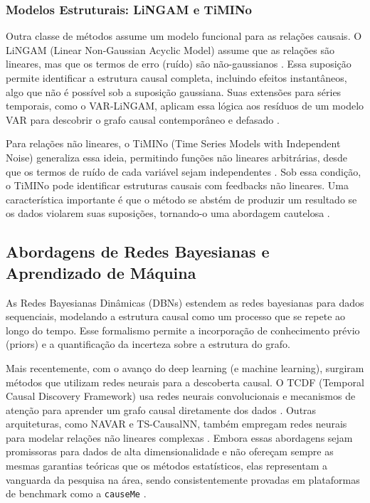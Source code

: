 \documentclass[12pt, a4paper]{article}
\begin{document}
\subsubsection{Modelos Estruturais: LiNGAM e TiMINo}
Outra classe de métodos assume um modelo funcional para as relações causais.
O LiNGAM (Linear Non-Gaussian Acyclic Model) assume que as relações são lineares, mas que os termos de erro (ruído) são não-gaussianos \cite{shimizu2006}. Essa suposição permite identificar a estrutura causal completa, incluindo efeitos instantâneos, algo que não é possível sob a suposição gaussiana. Suas extensões para séries temporais, como o VAR-LiNGAM, aplicam essa lógica aos resíduos de um modelo VAR para descobrir o grafo causal contemporâneo e defasado \cite{kretschmer2024review}.

Para relações não lineares, o TiMINo (Time Series Models with Independent Noise) generaliza essa ideia, permitindo funções não lineares arbitrárias, desde que os termos de ruído de cada variável sejam independentes \cite{peters2013}. Sob essa condição, o TiMINo pode identificar estruturas causais com feedbacks não lineares. Uma característica importante é que o método se abstém de produzir um resultado se os dados violarem suas suposições, tornando-o uma abordagem  cautelosa \cite{kretschmer2024review}.

\subsection{Abordagens de Redes Bayesianas e Aprendizado de Máquina}
As Redes Bayesianas Dinâmicas (DBNs) estendem as redes bayesianas para dados sequenciais, modelando a estrutura causal como um processo que se repete ao longo do tempo. Esse formalismo permite a incorporação de conhecimento prévio (priors) e a quantificação da incerteza sobre a estrutura do grafo.

Mais recentemente, com o avanço do deep learning (e machine learning), surgiram métodos que utilizam redes neurais para a descoberta causal. O TCDF (Temporal Causal Discovery Framework) usa redes neurais convolucionais e mecanismos de atenção para aprender um grafo causal diretamente dos dados \cite{nauta2019}. Outras arquiteturas, como NAVAR e TS-CausalNN, também empregam redes neurais para modelar relações não lineares complexas \cite{kretschmer2024review}. Embora essas abordagens sejam promissoras para dados de alta dimensionalidade e não ofereçam sempre as mesmas garantias teóricas que os métodos estatísticos, elas representam a vanguarda da pesquisa na área, sendo consistentemente provadas em plataformas de benchmark como a \texttt{causeMe} \cite{kretschmer2024review}.
\end{document}
